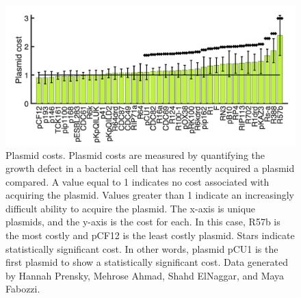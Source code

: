\documentclass{article}
\begin{document}
\begin{figure}
    \centering
    \includegraphics[width=\textwidth]{final_assignment_figs/final_assignment_fig1.png}
    \caption{Plasmid costs. Plasmid costs are measured by quantifying the growth defect in a bacterial cell that has recently acquired a plasmid compared. A value equal to 1 indicates no cost associated with acquiring the plasmid. Values greater than 1 indicate an increasingly difficult ability to acquire the plasmid. The x-axis is unique plasmids, and the y-axis is the cost for each. In this case, R57b is the most costly and pCF12 is the least costly plasmid. Stars indicate statistically significant cost. In other words, plasmid pCU1 is the first plasmid to show a statistically significant cost. Data generated by Hannah Prensky, Mehrose Ahmad, Shahd ElNaggar, and Maya Fabozzi.}
    \label{fig:fig1}
\end{figure}
\end{document}
